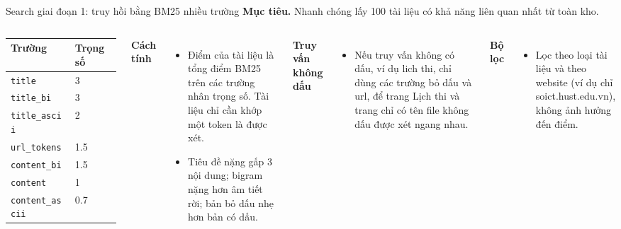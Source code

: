\documentclass[aspectratio=169,t,10pt]{beamer}
\newcommand{\code}[1]{\texttt{#1}}
\newcommand{\ex}[1]{{\ttfamily\footnotesize #1}}
\newcommand{\muctieu}[1]{\noindent\textbf{Mục tiêu.} #1\par\vspace{4pt}}
\begin{document}
\begin{frame}[shrink]{Search giai đoạn 1: truy hồi bằng BM25 nhiều trường}
\small
\muctieu{Nhanh chóng lấy 100 tài liệu có khả năng liên quan nhất từ toàn kho.}
\begin{columns}[T,onlytextwidth]
\footnotesize
\renewcommand{\arraystretch}{1.22}
\begin{tabularx}{\linewidth}{@{}YQ{1.4cm}@{}}
\toprule
\textbf{Trường} & \textbf{Trọng số}\\
\midrule
\code{title} & 3\\
\code{title\_bi} & 3\\
\code{title\_ascii} & 2\\
\code{url\_tokens} & 1.5\\
\code{content\_bi} & 1.5\\
\code{content} & 1\\
\code{content\_ascii} & 0.7\\
\bottomrule
\end{tabularx}
\small
\textbf{Cách tính}
\begin{itemize}
  \item Điểm của tài liệu là tổng điểm BM25 trên các trường nhân trọng số. Tài liệu chỉ cần khớp một token là được xét.
  \item Tiêu đề nặng gấp 3 nội dung; bigram nặng hơn âm tiết rời; bản bỏ dấu nhẹ hơn bản có dấu.
\end{itemize}
\textbf{Truy vấn không dấu}
\begin{itemize}
  \item Nếu truy vấn không có dấu, ví dụ \ex{lich thi}, chỉ dùng các trường bỏ dấu và url, để trang Lịch thi và trang chỉ có tên file không dấu được xét ngang nhau.
\end{itemize}
\textbf{Bộ lọc}
\begin{itemize}
  \item Lọc theo loại tài liệu và theo website (ví dụ chỉ soict.hust.edu.vn), không ảnh hưởng đến điểm.
\end{itemize}
\end{columns}
\end{frame}
\end{document}
